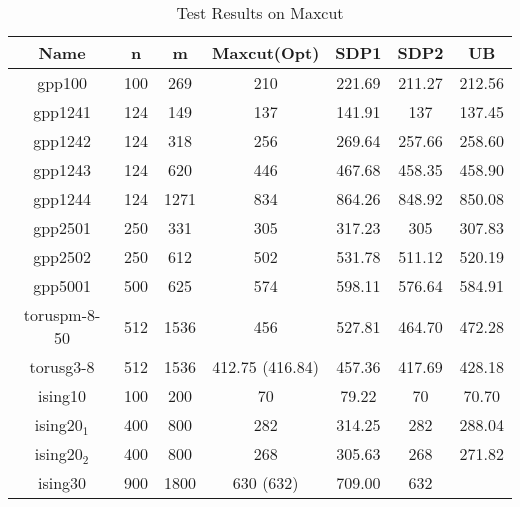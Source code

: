 \documentclass[12pt]{article}
\begin{document}
\begin{table}[htbp]
\begin{center}
\begin{tabular}{|c|c|c|c|c|c|c|} \hline
Name & n & m & Maxcut(Opt) & SDP1 & SDP2& UB \\
\hline \hline gpp100 \footnotemark[1] & 100 & 269 & 210 & 221.69 &
211.27 & 212.56  \\ \hline gpp1241 \footnotemark[1] & 124 & 149 &
137 & 141.91 & 137 & 137.45  \\ \hline gpp1242 \footnotemark[1] &
124 & 318 & 256 & 269.64 & 257.66 & 258.60  \\ \hline gpp1243
\footnotemark[1] & 124 & 620 & 446 & 467.68 & 458.35 & 458.90  \\
\hline gpp1244 \footnotemark[1] & 124 & 1271 & 834 & 864.26 &
848.92 & 850.08 \\ \hline gpp2501 \footnotemark[1] & 250 & 331 &
305 & 317.23 & 305 & 307.83  \\ \hline gpp2502 \footnotemark[1] &
250 & 612 & 502 & 531.78 & 511.12 & 520.19  \\ \hline gpp5001
\footnotemark[1] & 500 & 625 & 574 & 598.11 & 576.64
\footnotemark[4] & 584.91 \\ \hline toruspm-8-50 \footnotemark[2]
& 512 & 1536 & 456 & 527.81 & 464.70 \footnotemark[4] & 472.28 \\
\hline torusg3-8 \footnotemark[2] & 512 & 1536 & 412.75 (416.84) &
457.36 & 417.69 \footnotemark[4] & 428.18 \\ \hline ising10
\footnotemark[3] & 100 & 200 & 70 & 79.22 & 70 & 70.70 \\ \hline
ising$20_1$ \footnotemark[3] & 400 & 800 & 282 & 314.25 & 282 &
288.04  \\ \hline ising$20_2$ \footnotemark[3] & 400 & 800 & 268 &
305.63 & 268 & 271.82 \\ \hline ising30 \footnotemark[3] & 900 &
1800 & 630 (632) & 709.00 & 632 & \\ \hline
\end{tabular}
\caption{\label{maxcut_test_results} Test Results on Maxcut}
\end{center}
\end{table}

\end{document}
